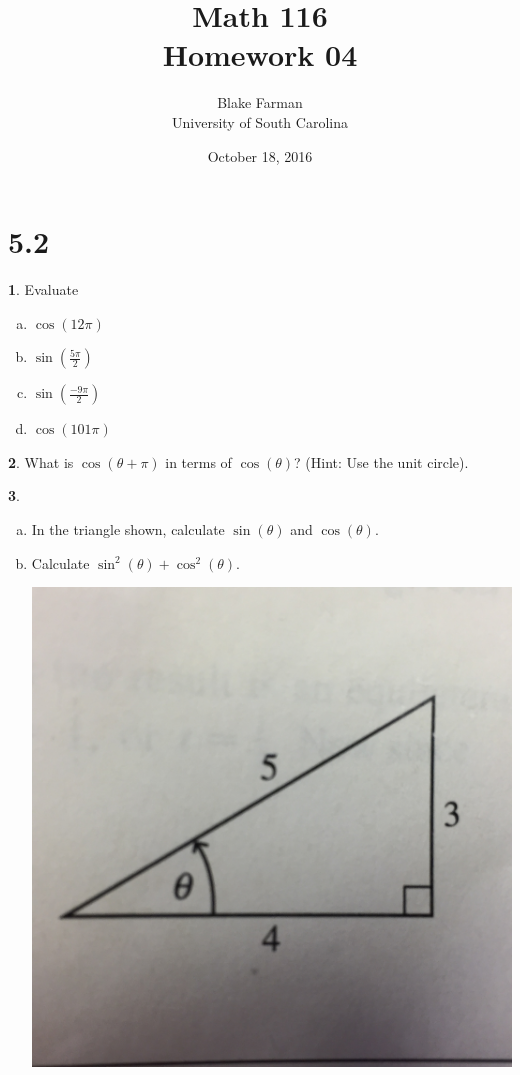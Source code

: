 \documentclass[12pt]{book}
\author{Blake Farman\\University of South Carolina}
\title{Math 116\\Homework 04}
\date{October 18, 2016}
\theoremstyle{definition}
\newtheorem{thm}{}
\begin{document}
\maketitle

\section*{5.2}

\setcounter{thm}{1}
\begin{thm}
Evaluate
\begin{enumerate}[(a)]
  \item 
    $\displaystyle{\cos(12\pi)}$
  \item
    $\displaystyle{\sin\left(\frac{5\pi}{2}\right)}$
  \item
    $\displaystyle{\sin\left(\frac{-9\pi}{2}\right)}$
  \item
    $\displaystyle{\cos(101\pi)}$
\end{enumerate}
\end{thm}

\setcounter{thm}{3}
\begin{thm}
  What is $\cos(\theta + \pi)$ in terms of $\cos(\theta)$? (Hint: Use the unit circle).
\end{thm}

\setcounter{thm}{5}
\begin{thm}
  \begin{enumerate}[(a)]
  \item
    In the triangle shown, calculate $\sin(\theta)$ and $\cos(\theta)$.
  \item
    Calculate $\sin^2(\theta) + \cos^2(\theta)$.

    \begin{center}
      \includegraphics[scale=0.05]{triangle.jpg}
    \end{center}
  \end{enumerate}
\end{thm}
\end{document}
